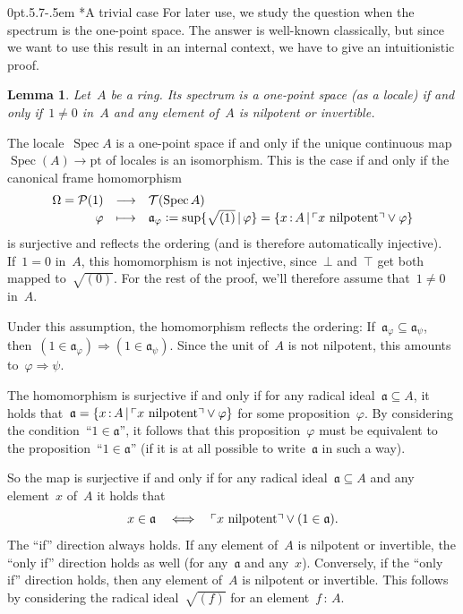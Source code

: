 \documentclass[10pt,reqno,a4paper]{amsbook}
\makeatletter
\theoremstyle{definition}
\theoremstyle{plain}
\newtheorem{lemma}[defn]{Lemma}
\theoremstyle{remark}
\renewcommand{\P}{\mathcal{P}}
\newcommand{\T}{\mathcal{T}}
\newcommand{\aaa}{\mathfrak{a}}
\newcommand{\pt}{\mathrm{pt}}
\DeclareMathOperator{\Spec}{Spec}
\newcommand{\Open}{\T}
\newcommand{\?}{\,{:}\,}
\renewcommand{\_}{\mathpunct{.}\,}
\newcommand{\speak}[1]{\ulcorner\text{\textnormal{#1}}\urcorner}
\newcommand{\defeq}{\vcentcolon=}
\renewenvironment{proof}[1][\proofname]{\par
  \pushQED{\qed}%
  \normalfont \topsep6\p@\@plus6\p@\relax
  \trivlist
  \item[\hskip\labelsep
        \itshape
    #1\@addpunct{.}]\ignorespaces
}{%
  \popQED\endtrivlist\@endpefalse
}
\def\subsection{\@startsection{subsection}{2}%
  {0pt}{.5\linespacing\@plus.7\linespacing}{-.5em}%
  {\normalfont\bfseries}}
\makeatother
\begin{document}
{\subsection*{A trivial case}
For later use, we study the question when the spectrum is the one-point space.
The answer is well-known classically, but since we want to use this result in
an internal context, we have to give an intuitionistic proof.
\begin{lemma}\label{lemma:spectrum-one-point}
Let~$A$ be a ring. Its spectrum is a one-point
space (as a locale) if and only if~$1 \neq 0$ in~$A$ and any element of~$A$ is nilpotent or
invertible.\end{lemma}
\begin{proof}The locale~$\Spec A$ is a one-point space if and only if the
unique continuous map~$\Spec(A) \to \pt$ of locales is an isomorphism. This is the case if and only
if the canonical frame homomorphism
\[ \begin{array}{@{}rcl@{}}
  \Omega = \P(1) &\longrightarrow& \Open(\Spec A) \\[0.1em]
  \varphi &\longmapsto& \aaa_\varphi \defeq \sup\{\sqrt{(1)} \,|\, \varphi \} =
  \{ x \? A \,|\, \speak{$x$ nilpotent} \vee \varphi \}
\end{array} \]
is surjective and reflects the ordering (and is therefore automatically
injective). If~$1 = 0$ in~$A$, this homomorphism is not injective, since~$\bot$
and~$\top$ get both mapped to~$\sqrt{(0)}$. For the rest of the proof, we'll
therefore assume that~$1 \neq 0$ in~$A$.

Under this assumption, the homomorphism reflects the ordering: If~$\aaa_\varphi \subseteq \aaa_\psi$,
then~$(1 \in \aaa_\varphi) \Rightarrow (1 \in \aaa_\psi)$. Since the unit
of~$A$ is not nilpotent, this amounts to~$\varphi \Rightarrow \psi$.

The homomorphism is surjective if and only if for any radical ideal~$\aaa \subseteq A$,
it holds that~$\aaa = \{ x \? A \,|\, \speak{$x$ nilpotent} \vee \varphi \}$
for some proposition~$\varphi$. By considering the condition~``$1 \in \aaa$'',
it follows that this proposition~$\varphi$ must be equivalent to the
proposition~``$1 \in \aaa$'' (if it is at all possible to write~$\aaa$ in such
a way).

So the map is surjective if and only if for any radical ideal~$\aaa \subseteq
A$ and any element~$x$ of~$A$ it holds that
\[ x \in \aaa \quad\Longleftrightarrow\quad
  \speak{$x$ nilpotent} \vee (1 \in \aaa). \]
The ``if'' direction always holds. If any element of~$A$ is nilpotent or
invertible, the ``only if'' direction holds as well (for any~$\aaa$ and any~$x$).
Conversely, if the ``only if'' direction holds, then any element of~$A$ is
nilpotent or invertible. This follows by
considering the radical ideal~$\sqrt{(f)}$ for an element~$f \? A$.
\end{proof}

}
\end{document}
